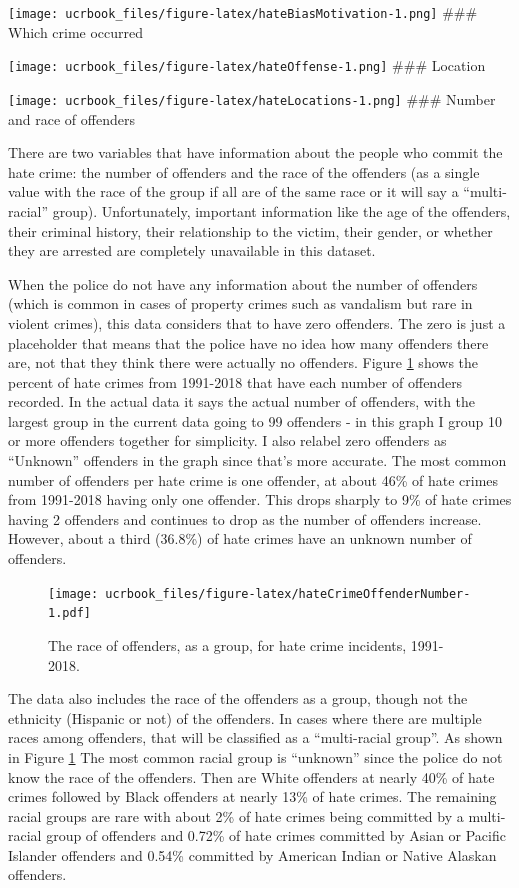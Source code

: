 \documentclass[
  12pt,
  openany]{book}
\begin{document}
\texttt{[image: ucrbook\_files/figure-latex/hateBiasMotivation-1.png]}
\#\#\# Which crime occurred

\texttt{[image: ucrbook\_files/figure-latex/hateOffense-1.png]}
\#\#\# Location

\texttt{[image: ucrbook\_files/figure-latex/hateLocations-1.png]}
\#\#\# Number and race of offenders

There are two variables that have information about the people who commit the hate crime: the number of offenders and the race of the offenders (as a single value with the race of the group if all are of the same race or it will say a ``multi-racial'' group). Unfortunately, important information like the age of the offenders, their criminal history, their relationship to the victim, their gender, or whether they are arrested are completely unavailable in this dataset.

When the police do not have any information about the number of offenders (which is common in cases of property crimes such as vandalism but rare in violent crimes), this data considers that to have zero offenders. The zero is just a placeholder that means that the police have no idea how many offenders there are, not that they think there were actually no offenders. Figure \ref{fig:hateCrimeOffenderNumber} shows the percent of hate crimes from 1991-2018 that have each number of offenders recorded. In the actual data it says the actual number of offenders, with the largest group in the current data going to 99 offenders - in this graph I group 10 or more offenders together for simplicity. I also relabel zero offenders as ``Unknown'' offenders in the graph since that's more accurate. The most common number of offenders per hate crime is one offender, at about 46\% of hate crimes from 1991-2018 having only one offender. This drops sharply to 9\% of hate crimes having 2 offenders and continues to drop as the number of offenders increase. However, about a third (36.8\%) of hate crimes have an unknown number of offenders.

\begin{figure}
\centering
\texttt{[image: ucrbook\_files/figure-latex/hateCrimeOffenderNumber-1.pdf]}
\caption{\label{fig:hateCrimeOffenderNumber}The race of offenders, as a group, for hate crime incidents, 1991-2018.}
\end{figure}

The data also includes the race of the offenders as a group, though not the ethnicity (Hispanic or not) of the offenders. In cases where there are multiple races among offenders, that will be classified as a ``multi-racial group''. As shown in Figure \ref{fig:hateCrimeOffenderNumber} The most common racial group is ``unknown'' since the police do not know the race of the offenders. Then are White offenders at nearly 40\% of hate crimes followed by Black offenders at nearly 13\% of hate crimes. The remaining racial groups are rare with about 2\% of hate crimes being committed by a multi-racial group of offenders and 0.72\% of hate crimes committed by Asian or Pacific Islander offenders and 0.54\% committed by American Indian or Native Alaskan offenders.
\end{document}
